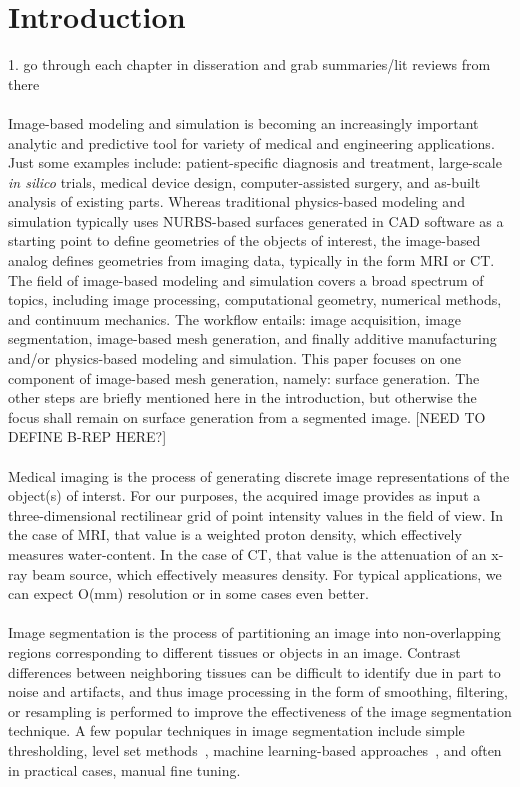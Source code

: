 \section{Introduction}

1. go through each chapter in disseration and grab summaries/lit reviews from there \\ \\
%
Image-based modeling and simulation is becoming an increasingly important analytic and predictive tool for variety of medical and engineering applications. Just some examples include: patient-specific diagnosis and treatment, large-scale \textit{in silico} trials, medical device design, computer-assisted surgery, and as-built analysis of existing parts. Whereas traditional physics-based modeling and simulation typically uses NURBS-based surfaces generated in CAD software as a starting point to define geometries of the objects of interest, the image-based analog defines geometries from imaging data, typically in the form MRI or CT. The field of image-based modeling and simulation covers a broad spectrum of topics, including image processing, computational geometry, numerical methods, and continuum mechanics. The workflow entails: image acquisition, image segmentation, image-based mesh generation, and finally additive manufacturing and/or physics-based modeling and simulation. This paper focuses on one component of image-based mesh generation, namely: surface generation. The other steps are briefly mentioned here in the introduction, but otherwise the focus shall remain on surface generation from a segmented image. [NEED TO DEFINE B-REP HERE?] \\ \\
%
Medical imaging is the process of generating discrete image representations of the object(s) of interst. For our purposes, the acquired image provides as input a three-dimensional rectilinear grid of point intensity values in the field of view. In the case of MRI, that value is a weighted proton density, which effectively measures water-content. In the case of CT, that value is the attenuation of an x-ray beam source, which effectively measures density. For typical applications, we can expect O(mm) resolution or in some cases even better. \\ \\
%
Image segmentation is the process of partitioning an image into non-overlapping regions corresponding to different tissues or objects in an image. Contrast differences between neighboring tissues can be difficult to identify due in part to noise and artifacts, and thus image processing in the form of smoothing, filtering, or resampling is performed to improve the effectiveness of the image segmentation technique. A few popular techniques in image segmentation include simple thresholding, level set methods~\cite{malladi_1995, sethian_1996}, machine learning-based approaches~\cite{litjens_2017}, and often in practical cases, manual fine tuning.\\ \\
